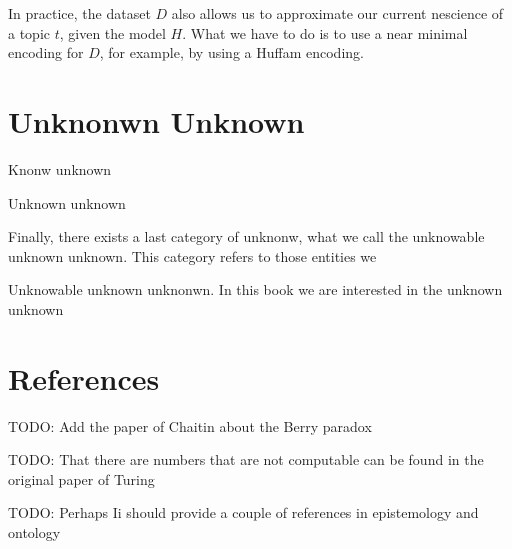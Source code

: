 In practice, the dataset $D$ also allows us to approximate our current
nescience of a topic $t$, given the model $H$. What we have to do
is to use a near minimal encoding for $D$, for example, by using
a Huffam encoding.


%
%

\section{Unknonwn Unknown}

Knonw unknown

Unknown unknown

Finally, there exists a last category of unknonw, what we call the unknowable unknown unknown. This category refers to those entities we

Unknowable unknown unknonwn. In this book we are interested in the unknown unknown

%
%

\section*{References}

{\color{red} TODO: Add the paper of Chaitin about the Berry paradox}

{\color{red} TODO: That there are numbers that are not computable can be found in the original paper of Turing}

{\color{red} TODO: Perhaps Ii should provide a couple of references in epistemology and ontology}

